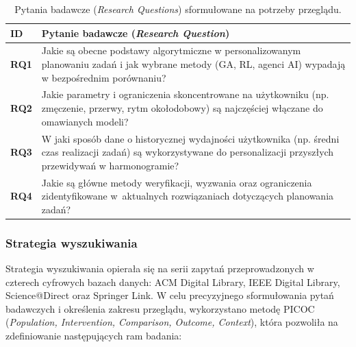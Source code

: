 \begin{table}[h!]
\caption{Pytania badawcze (\textit{Research Questions}) sformułowane na potrzeby przeglądu.}\label{tab:research_questions}       
\begin{tabular}{p{0.8cm}p{14.4cm}}
\hline
\textbf{ID} & \textbf{Pytanie badawcze (\textit{Research Question})} \\ \hline
\textbf{RQ1} & Jakie są obecne podstawy algorytmiczne w personalizowanym planowaniu zadań i jak wybrane metody (GA, RL, agenci AI) wypadają w bezpośrednim porównaniu? \\ \hline
\textbf{RQ2} & Jakie parametry i ograniczenia skoncentrowane na użytkowniku (np. zmęczenie, przerwy, rytm okołodobowy) są najczęściej włączane do omawianych modeli? \\ \hline
\textbf{RQ3} & W jaki sposób dane o historycznej wydajności użytkownika (np. średni czas realizacji zadań) są wykorzystywane do personalizacji przyszłych przewidywań w harmonogramie? \\ \hline
\textbf{RQ4} & Jakie są główne metody weryfikacji, wyzwania oraz ograniczenia zidentyfikowane w~aktualnych rozwiązaniach dotyczących planowania zadań? \\ \hline
\end{tabular}
\end{table}

    \subsubsection{Strategia wyszukiwania}
    \quad Strategia wyszukiwania opierała się na serii zapytań przeprowadzonych w czterech cyfrowych bazach danych: ACM Digital Library, IEEE Digital Library, Science@Direct oraz Springer Link. W celu precyzyjnego sformułowania pytań badawczych i określenia zakresu przeglądu, wykorzystano metodę PICOC (\textit{Population, Intervention, Comparison, Outcome, Context}), która pozwoliła na zdefiniowanie następujących ram badania:


